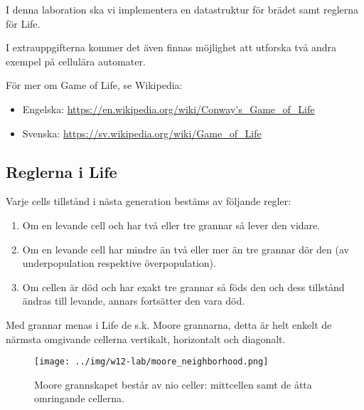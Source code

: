 \vspace{5mm}

I denna laboration ska vi implementera en datastruktur för brädet samt reglerna för Life.

I extrauppgifterna kommer det även finnas möjlighet att utforska två andra exempel på cellulära automater.

\vspace{5mm}

För mer om Game of Life, se Wikipedia:

\begin{itemize}[noitemsep,topsep=0pt]
    	\item Engelska: \url{https://en.wikipedia.org/wiki/Conway's_Game_of_Life}
    	\item Svenska: \url{https://sv.wikipedia.org/wiki/Game_of_Life}
\end{itemize}


\subsection{Reglerna i Life}
\label{subsec:life-rules}

Varje cells tillstånd i nästa generation bestäms av följande regler:
\begin{enumerate}
    \item Om en levande cell och har två eller tre grannar så lever den vidare.
    \item Om en levande cell har mindre än två eller mer än tre grannar dör den (av underpopulation respektive överpopulation).
    \item Om cellen är död och har exakt tre grannar så föds den och dess tillstånd ändras till levande, annars fortsätter den vara död.
\end{enumerate}

Med grannar menas i Life de s.k. Moore grannarna, detta är helt enkelt de närmsta omgivande cellerna vertikalt, horizontalt och diagonalt.

\begin{figure}[h]
  \begin{center}
    \texttt{[image: ../img/w12-lab/moore\_neighborhood.png]}
  \end{center}
  \caption{Moore grannskapet består av nio celler: mittcellen samt de åtta omringande cellerna.\protect\footnotemark}
\end{figure}


